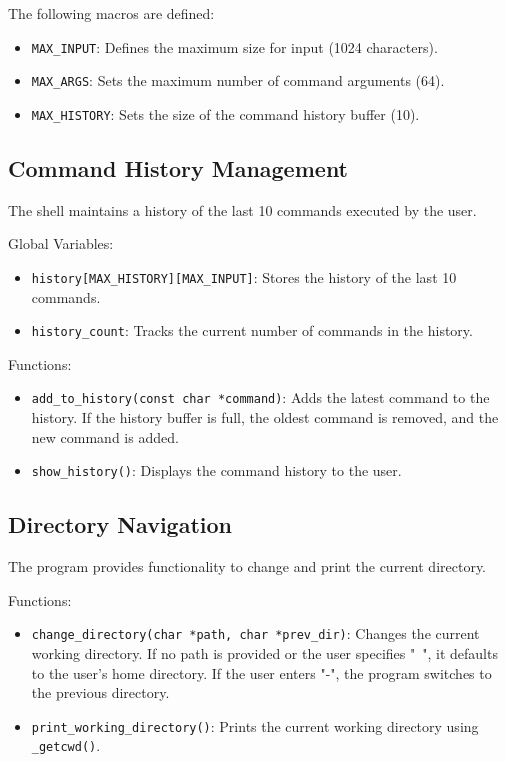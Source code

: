 \documentclass[conference]{IEEEtran}
\begin{document}
The following macros are defined:

\begin{itemize}
\item \texttt{MAX\_INPUT}: Defines the maximum size for input (1024 characters).
\item \texttt{MAX\_ARGS}: Sets the maximum number of command arguments (64).
\item \texttt{MAX\_HISTORY}: Sets the size of the command history buffer (10).
\end{itemize}

\subsection{Command History Management}
The shell maintains a history of the last 10 commands executed by the user.

Global Variables:

\begin{itemize}
\item \texttt{history[MAX\_HISTORY][MAX\_INPUT]}: Stores the history of the last 10 commands.
\item \texttt{history\_count}: Tracks the current number of commands in the history.
\end{itemize}

Functions:

\begin{itemize}
\item \texttt{add\_to\_history(const char *command)}: Adds the latest command to the history. If the history buffer is full, the oldest command is removed, and the new command is added.
\item \texttt{show\_history()}: Displays the command history to the user.
\end{itemize}

\subsection{Directory Navigation}
The program provides functionality to change and print the current directory.

Functions:

\begin{itemize}
\item \texttt{change\_directory(char *path, char *prev\_dir)}: Changes the current working directory. If no path is provided or the user specifies "~", it defaults to the user's home directory. If the user enters "-", the program switches to the previous directory.
\item \texttt{print\_working\_directory()}: Prints the current working directory using \texttt{\_getcwd()}.
\end{itemize}
\end{document}

